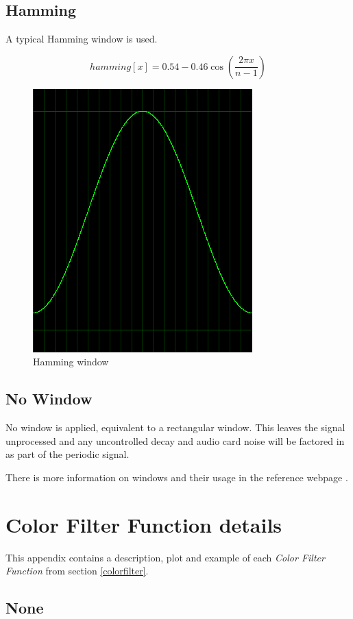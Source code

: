\documentclass[10pt,a4paper]{report}
\begin{document}
\begin{appendices}
\newpage
\section{Hamming}
A typical Hamming window is used.

\begin{equation}
hamming[x] = 0.54 - 0.46\cos(\frac{2\pi x}{n-1})
\end{equation}

\begin{figure}[H]
	\centering
	\includegraphics[width=0.4\linewidth]{plots/window-hamming.png}
	\caption[Hamming window]{Hamming window}
	\label{fig:window-hamming}
\end{figure}


\section{No Window}

No window is applied, equivalent to a rectangular window. This leaves the signal unprocessed and any uncontrolled decay and audio card noise will be factored in as part of the periodic signal.

There is more information on windows and their usage in the reference webpage \cite{windowtypes}.

\chapter{Color Filter Function details}
\label{filterfunctions}

This appendix contains a description, plot and example of each \textit{Color Filter Function} from section \ref{colorfilter}.

\newpage
\section{None} 


\end{appendices}
\end{document}
